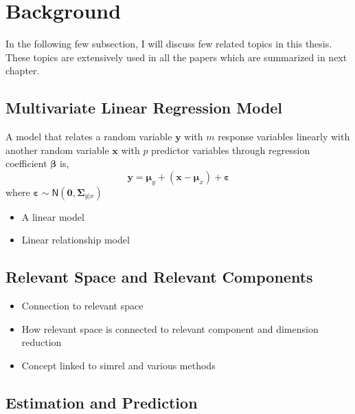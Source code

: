 \documentclass[11pt,twoside,openright,titlepage,
  headinclude,footinclude,BCOR=5mm,
  numbers=noenddot,cleardoublepage=empty,
  tablecaptionabove, dottedtoc,
  bibliography=totoc]{scrreprt}
\providecommand{\tightlist}{%
  \setlength{\itemsep}{0pt}\setlength{\parskip}{0pt}}
\begin{document}
\hypertarget{background}{%
\section{Background}\label{background}}

In the following few subsection, I will discuss few related topics in this thesis. These topics are extensively used in all the papers which are summarized in next chapter.

\hypertarget{multivariate-linear-regression-model}{%
\subsection{Multivariate Linear Regression Model}\label{multivariate-linear-regression-model}}

A model that relates a random variable \(\mathbold{y}\) with \(m\) response variables linearly with another random variable \(\mathbold{x}\) with \(p\) predictor variables through regression coefficient \(\boldsymbol{\beta}\) is,
\begin{equation}
\mathbold{y} = \boldsymbol{\mu}_y + \left(\mathbold{x} - \boldsymbol{\mu}_x\right) + \boldsymbol{\varepsilon}
\end{equation}
where \(\boldsymbol{\varepsilon} \sim \textsf{N}\left(\mathbold{0}, \boldsymbol{\Sigma}_{y|x}\right)\)

\begin{itemize}
\tightlist
\item
  A linear model
\item
  Linear relationship model
\end{itemize}

\hypertarget{relevant-space-and-relevant-components}{%
\subsection{Relevant Space and Relevant Components}\label{relevant-space-and-relevant-components}}

\begin{itemize}
\tightlist
\item
  Connection to relevant space
\item
  How relevant space is connected to relevant component and dimension reduction
\item
  Concept linked to simrel and various methods
\end{itemize}

\hypertarget{estimation-and-prediction}{%
\subsection{Estimation and Prediction}\label{estimation-and-prediction}}
\end{document}
